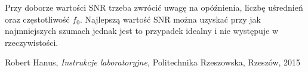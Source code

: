 \documentclass{classrep}
\begin{document}
Przy doborze wartości SNR trzeba zwrócić uwagę na opóźnienia, liczbę uśrednień oraz częstotliwość $f_0$. Najlepszą wartość SNR można uzyskać przy jak najmniejszych szumach jednak jest to przypadek idealny i nie występuje w rzeczywistości.


\begin{thebibliography}{0}
   Robert Hanus, \textsl{Instrukcje laboratoryjne,} Politechnika Rzeszowska, Rzeszów, 2015
\end{thebibliography}
\end{document}
